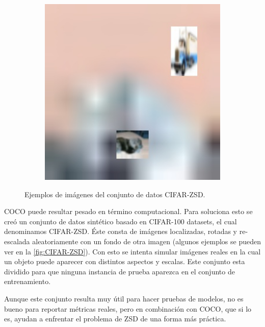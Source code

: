 \begin{figure}[H]
\begin{center}
\begin{subfigure}{.3\textwidth}
		\label{fig:ex2}
	\end{subfigure}
	\begin{subfigure}{.3\textwidth}
		\includegraphics[width=1\textwidth]{img/cifar-zsd-test283.jpg}
		\label{fig:ex3}
	\end{subfigure}
	\caption{Ejemplos de imágenes del conjunto de datos CIFAR-ZSD.}
	\label{fig:CIFAR-ZSD}
	\end{center}
\end{figure}

COCO puede resultar pesado en término computacional. Para soluciona esto se creó un conjunto de datos sintético basado en CIFAR-100 datasets, el cual denominamos CIFAR-ZSD. Éste consta de imágenes localizadas, rotadas y re-escalada aleatoriamente con un fondo de otra imagen (algunos ejemplos se pueden ver en la \autoref{fig:CIFAR-ZSD}). Con esto se intenta simular imágenes reales en la cual un objeto puede aparecer con distintos aspectos y escalas. Este conjunto esta dividido para que ninguna instancia de prueba  aparezca en el conjunto de entrenamiento.

Aunque este conjunto resulta muy útil para hacer pruebas de modelos, no es bueno para reportar métricas reales, pero en combinación con COCO, que si lo es, ayudan a enfrentar el problema de ZSD de una forma más práctica.

